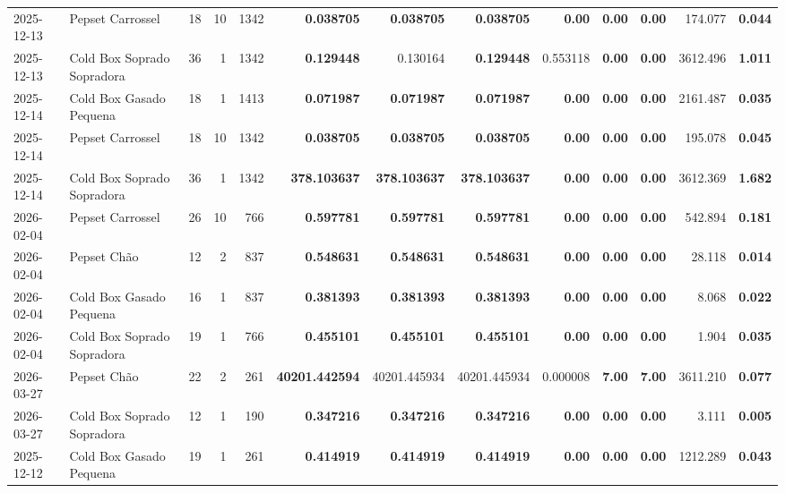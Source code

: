 {\begin{center}
{\begin{tabular}{@{}llrrrrrrrrrrr@{}}
2025-12-13 & Pepset Carrossel & 18 & 10 & 1342 & \textbf{0.038705} & \textbf{0.038705} & \textbf{0.038705} & \textbf{0.00} & \textbf{0.00} & \textbf{0.00} & 174.077 & \textbf{0.044} \\
2025-12-13 & Cold Box Soprado Sopradora & 36 & 1 & 1342 & \textbf{0.129448} & 0.130164 & \textbf{0.129448} & 0.553118 & \textbf{0.00} & \textbf{0.00} & 3612.496 & \textbf{1.011} \\
2025-12-14 & Cold Box Gasado Pequena & 18 & 1 & 1413 & \textbf{0.071987} & \textbf{0.071987} & \textbf{0.071987} & \textbf{0.00} & \textbf{0.00} & \textbf{0.00} & 2161.487 & \textbf{0.035} \\
2025-12-14 & Pepset Carrossel & 18 & 10 & 1342 & \textbf{0.038705} & \textbf{0.038705} & \textbf{0.038705} & \textbf{0.00} & \textbf{0.00} & \textbf{0.00} & 195.078 & \textbf{0.045} \\
2025-12-14 & Cold Box Soprado Sopradora & 36 & 1 & 1342 & \textbf{378.103637} & \textbf{378.103637} & \textbf{378.103637} & \textbf{0.00} & \textbf{0.00} & \textbf{0.00} & 3612.369 & \textbf{1.682} \\
2026-02-04 & Pepset Carrossel & 26 & 10 & 766 & \textbf{0.597781} & \textbf{0.597781} & \textbf{0.597781} & \textbf{0.00} & \textbf{0.00} & \textbf{0.00} & 542.894 & \textbf{0.181} \\
2026-02-04 & Pepset Chão & 12 & 2 & 837 & \textbf{0.548631} & \textbf{0.548631} & \textbf{0.548631} & \textbf{0.00} & \textbf{0.00} & \textbf{0.00} & 28.118 & \textbf{0.014} \\
2026-02-04 & Cold Box Gasado Pequena & 16 & 1 & 837 & \textbf{0.381393} & \textbf{0.381393} & \textbf{0.381393} & \textbf{0.00} & \textbf{0.00} & \textbf{0.00} & 8.068 & \textbf{0.022} \\
2026-02-04 & Cold Box Soprado Sopradora & 19 & 1 & 766 & \textbf{0.455101} & \textbf{0.455101} & \textbf{0.455101} & \textbf{0.00} & \textbf{0.00} & \textbf{0.00} & 1.904 & \textbf{0.035} \\
2026-03-27 & Pepset Chão & 22 & 2 & 261 & \textbf{40201.442594} & 40201.445934 & 40201.445934 & 0.000008 & \textbf{7.00} & \textbf{7.00} & 3611.210 & \textbf{0.077} \\
2026-03-27 & Cold Box Soprado Sopradora & 12 & 1 & 190 & \textbf{0.347216} & \textbf{0.347216} & \textbf{0.347216} & \textbf{0.00} & \textbf{0.00} & \textbf{0.00} & 3.111 & \textbf{0.005} \\
2025-12-12 & Cold Box Gasado Pequena & 19 & 1 & 261 & \textbf{0.414919} & \textbf{0.414919} & \textbf{0.414919} & \textbf{0.00} & \textbf{0.00} & \textbf{0.00} & 1212.289 & \textbf{0.043} \\

\end{tabular}}
\end{center}}
